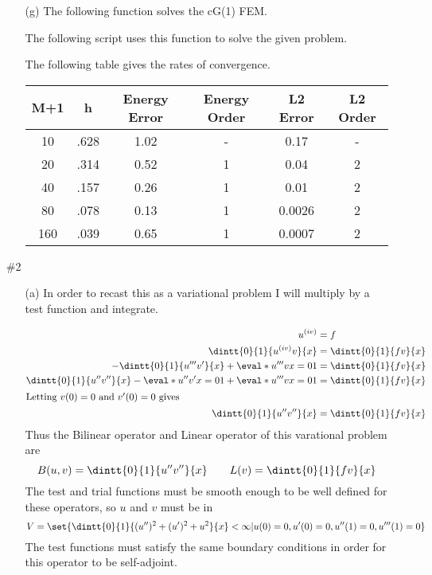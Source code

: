 \documentclass[11pt, oneside]{article}
\begin{document}
\begin{enumerate}
\begin{enumerate}
    \item[(g)]
      The following function solves the cG(1) FEM.
      
      The following script uses this function to solve the given problem.
      

      The following table gives the rates of convergence.
      \begin{center}
        \begin{tabular}{cccccc}
          \toprule
          M+1 & h & Energy Error & Energy Order & L2 Error & L2 Order \\
          \midrule
           10 & .628 & 1.02 & - & 0.17   & -\\
           20 & .314 & 0.52 & 1 & 0.04   & 2\\
           40 & .157 & 0.26 & 1 & 0.01   & 2\\
           80 & .078 & 0.13 & 1 & 0.0026 & 2\\
          160 & .039 & 0.65 & 1 & 0.0007 & 2\\
          \bottomrule
        \end{tabular}
      \end{center}

    \end{enumerate}

  \item[\#2]
    \begin{enumerate}
      \item[(a)] %
        In order to recast this as a variational problem I will multiply by a
        test function and integrate.

        \begin{align*}
          u^{(iv)} &= f \\
          \dintt{0}{1}{u^{(iv)}v}{x} &= \dintt{0}{1}{fv}{x} \\
          -\dintt{0}{1}{u'''v'}{x} + \eval*{u'''v}{x = 0}{1} &= \dintt{0}{1}{fv}{x} \\
          \dintt{0}{1}{u''v''}{x} - \eval*{u''v'}{x = 0}{1} + \eval*{u'''v}{x = 0}{1} &= \dintt{0}{1}{fv}{x} \\
          \intertext{Letting $v(0) = 0$ and $v'(0) = 0$ gives}
          \dintt{0}{1}{u''v''}{x} &= \dintt{0}{1}{fv}{x} \\
        \end{align*}
        Thus the Bilinear operator and Linear operator of this varational
        problem are
        \[
          B(u, v) = \dintt{0}{1}{u''v''}{x} \qquad L(v) = \dintt{0}{1}{fv}{x}
        \]
        The test and trial functions must be smooth enough to be well defined
        for these operators, so $u$ and $v$ must be in
        \[
          V = \set{\dintt{0}{1}{(u'')^2 + (u')^2 + u^2}{x} < \infty | u(0) = 0,
            u'(0) = 0, u''(1) = 0, u'''(1) = 0}
        \]
        The test functions must satisfy the same boundary conditions in order
        for this operator to be self-adjoint.


\end{enumerate}
\end{enumerate}
\end{document}
